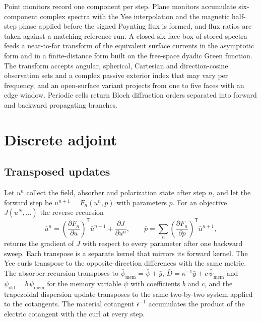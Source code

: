 \documentclass[preprint,11pt]{elsarticle}
\begin{document}
Point monitors record one component per step. Plane monitors accumulate six-component complex spectra with the Yee interpolation and the magnetic half-step phase applied before the signed Poynting flux is formed, and flux ratios are taken against a matching reference run. A closed six-face box of stored spectra feeds a near-to-far transform of the equivalent surface currents \citep{luebbers1991} in the asymptotic form and in a finite-distance form built on the free-space dyadic Green function. The transform accepts angular, spherical, Cartesian and direction-cosine observation sets and a complex passive exterior index that may vary per frequency, and an open-surface variant projects from one to five faces with an edge window. Periodic cells return Bloch diffraction orders separated into forward and backward propagating branches.

\section{Discrete adjoint}
\label{sec:adjoint}

\subsection{Transposed updates}

Let $u^{n}$ collect the field, absorber and polarization state after step $n$, and let the forward step be $u^{n+1}=F_n(u^{n},p)$ with parameters $p$. For an objective $J(u^{N},\ldots)$ the reverse recursion
\begin{equation}
\bar u^{n}=\left(\frac{\partial F_n}{\partial u}\right)^{\!\mathsf T}\bar u^{n+1}+\frac{\partial J}{\partial u^{n}},\qquad
\bar p=\sum_n\left(\frac{\partial F_n}{\partial p}\right)^{\!\mathsf T}\bar u^{n+1},
\label{eq:adjoint}
\end{equation}
returns the gradient of $J$ with respect to every parameter after one backward sweep. Each transpose is a separate kernel that mirrors its forward kernel. The Yee curls transpose to the opposite-direction differences with the same metric. The absorber recursion transposes to $\bar\psi_{\mathrm{mem}}=\bar\psi+\bar y$, $\bar D=\kappa^{-1}\bar y+c\,\bar\psi_{\mathrm{mem}}$ and $\bar\psi_{\mathrm{old}}=b\,\bar\psi_{\mathrm{mem}}$ for the memory variable $\psi$ with coefficients $b$ and $c$, and the trapezoidal dispersion update transposes to the same two-by-two system applied to the cotangents. The material cotangent $\bar\epsilon^{-1}$ accumulates the product of the electric cotangent with the curl at every step.
\end{document}

